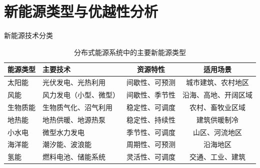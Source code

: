 \documentclass[aspectratio=169]{beamer}
\begin{document}
\section{新能源类型与优越性分析}

\begin{frame}{新能源技术分类}
  \begin{table}
    \centering
    \small
    \begin{tabular}{llcc}
      \toprule
      \textbf{能源类型} & \textbf{主要技术} & \textbf{资源特性} & \textbf{适用场景} \\
      \midrule
      太阳能 & 光伏发电、光热利用 & 间歇性、可预测 & 城市建筑、农村地区 \\
      风能 & 风力发电（小型、微型） & 间歇性、季节性 & 沿海、高地、开阔区域 \\
      生物质能 & 生物质气化、沼气利用 & 稳定性、可调度 & 农村、畜牧业区域 \\
      地热能 & 地热供暖、地源热泵 & 稳定性、持续性 & 建筑供暖制冷 \\
      小水电 & 微型水力发电 & 季节性、可调度 & 山区、河流地区 \\
      海洋能 & 潮汐能、波浪能 & 周期性、可预测 & 沿海地区 \\
      氢能 & 燃料电池、储能系统 & 灵活性、可调度 & 交通、工业、建筑 \\
      \bottomrule
    \end{tabular}
    \caption{分布式能源系统中的主要新能源类型\cite{Zhang2022}}
  \end{table}
\end{frame}
\end{document}

